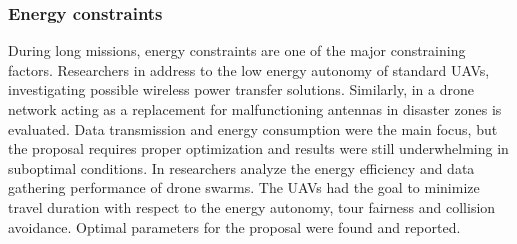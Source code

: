 \documentclass[journal]{IEEEtran}
\begin{document}
\subsubsection{Energy constraints}
During long missions, energy constraints are one of the major constraining factors. Researchers in \cite{powertransf} address to the low energy autonomy of standard UAVs, investigating possible wireless power transfer solutions. Similarly, in \cite{wirelessdisaster} a drone network acting as a replacement for malfunctioning antennas in disaster zones is evaluated. Data transmission and energy consumption were the main focus, but the proposal requires proper optimization and results were still underwhelming in suboptimal conditions. In \cite{swarmtrack} researchers analyze the energy efficiency and data gathering performance of drone swarms. The UAVs had the goal to minimize travel duration with respect to the energy autonomy, tour fairness and collision avoidance. Optimal parameters for the proposal were found and reported.
\end{document}
